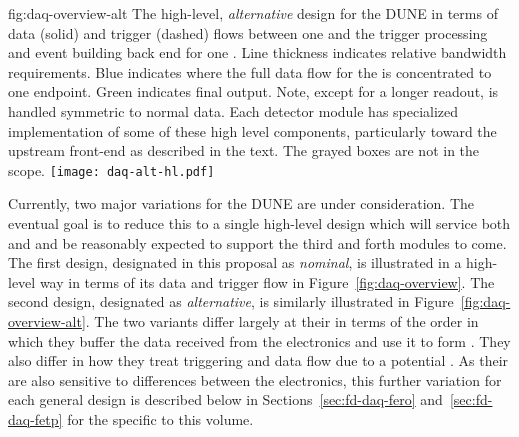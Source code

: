 \begin{dunefigure}{fig:daq-overview-alt}
  {The high-level, \textit{alternative} design for the DUNE   in
    terms of data (solid) and trigger (dashed) flows between one
      and the trigger processing and event
    building back end for one . 
    Line thickness indicates relative bandwidth requirements.
    Blue indicates where the full data flow for the  is
    concentrated to one endpoint.
    Green indicates final output.
    Note, except for a longer readout,  is handled
    symmetric to normal data.
    Each detector module has specialized implementation of some of
    these high level components, particularly toward the upstream
    front-end as described in the text. 
    The grayed boxes are not in the  scope.
  }
  \texttt{[image: daq-alt-hl.pdf]}%
\end{dunefigure}

Currently, two major variations for the DUNE  are under consideration. %
The eventual goal is to reduce this to a single high-level design
which will service both \single and \dual {} and be reasonably
expected to support the third and forth modules to come.
The first design, designated in this proposal as \textit{nominal}, is
illustrated in a high-level way in terms of its data and trigger flow
in Figure~\ref{fig:daq-overview}. 
The second design, designated as \textit{alternative}, is similarly
illustrated in Figure~\ref{fig:daq-overview-alt}. 
The two variants differ largely at their  in terms of the
order in which they buffer the data received from the  
electronics and use it to form . 
They also differ in how they treat triggering and data flow due to a
potential . 
As their  are also sensitive to differences between the
 electronics, this further variation for each general
design is described below in Sections~\ref{sec:fd-daq-fero}
and~\ref{sec:fd-daq-fetp} for the   specific to this volume.

